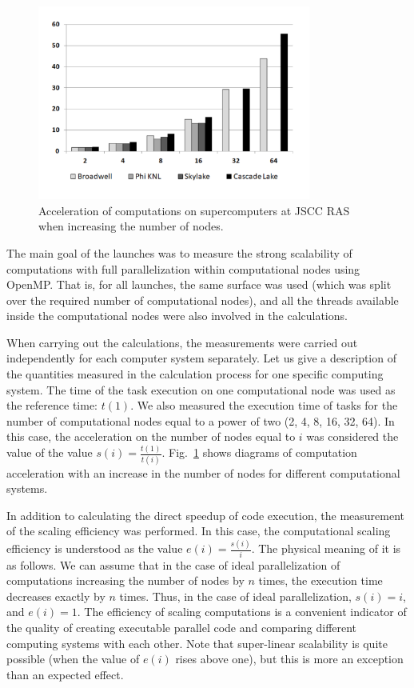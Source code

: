 \documentclass[
11pt,%
tightenlines,%
twoside,%
onecolumn,%
nofloats,%
nobibnotes,%
nofootinbib,%
superscriptaddress,%
noshowpacs,%
centertags]%
{revtex4}
\begin{document}
\begin{figure}[h]
\includegraphics[width=0.8\textwidth]{pics/speedup.pdf}
\caption{Acceleration of computations on supercomputers at JSCC RAS when increasing the number of nodes.}\label{fig:speedup}
\end{figure}

The main goal of the launches was to measure the strong scalability of computations with full parallelization within computational nodes using OpenMP.
That is, for all launches, the same surface was used (which was split over the required number of computational nodes), and all the threads available inside the computational nodes were also involved in the calculations.

When carrying out the calculations, the measurements were carried out independently for each computer system separately.
Let us give a description of the quantities measured in the calculation process for one specific computing system.
The time of the task execution on one computational node was used as the reference time: $ t(1) $.
We also measured the execution time of tasks for the number of computational nodes equal to a power of two (2, 4, 8, 16, 32, 64).
In this case, the acceleration on the number of nodes equal to $ i $ was considered the value of the value $ s(i) = \frac{t(1)}{t(i)} $.
Fig.~\ref{fig:speedup} shows diagrams of computation acceleration with an increase in the number of nodes for different computational systems.

In addition to calculating the direct speedup of code execution, the measurement of the scaling efficiency was performed.
In this case, the computational scaling efficiency is understood as the value $ e(i) = \frac{s(i)}{i} $.
The physical meaning of it is as follows.
We can assume that in the case of ideal parallelization of computations increasing the number of nodes by $ n $ times, the execution time decreases exactly by $ n $ times.
Thus, in the case of ideal parallelization, $ s (i) = i $, and $ e(i) = 1 $.
The efficiency of scaling computations is a convenient indicator of the quality of creating executable parallel code and comparing different computing systems with each other.
Note that super-linear scalability is quite possible (when the value of $ e(i) $ rises above one), but this is more an exception than an expected effect.
\end{document}
